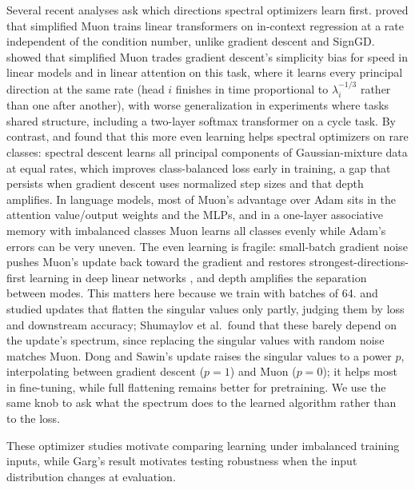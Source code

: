 \documentclass{article}
\begin{document}
Several recent analyses ask which directions spectral optimizers learn first. \citet{ma2026} proved that simplified Muon trains linear transformers on in-context regression at a rate independent of the condition number, unlike gradient descent and SignGD. \citet{dragutinovic2026} showed that simplified Muon trades gradient descent's simplicity bias for speed in linear models and in linear attention on this task, where it learns every principal direction at the same rate (head $i$ finishes in time proportional to $\lambda_i^{-1/3}$ rather than one after another), with worse generalization in experiments where tasks shared structure, including a two-layer softmax transformer on a cycle task. By contrast, \citet{vasudeva2025} and \citet{wang2025muon} found that this more even learning helps spectral optimizers on rare classes: spectral descent learns all principal components of Gaussian-mixture data at equal rates, which improves class-balanced loss early in training, a gap that persists when gradient descent uses normalized step sizes and that depth amplifies. In language models, most of Muon's advantage over Adam sits in the attention value/output weights and the MLPs, and in a one-layer associative memory with imbalanced classes Muon learns all classes evenly while Adam's errors can be very uneven. The even learning is fragile: small-batch gradient noise pushes Muon's update back toward the gradient and restores strongest-directions-first learning in deep linear networks \citep{jacobs2026}, and depth amplifies the separation between modes. This matters here because we train with batches of 64. \citet{dong2026muonp} and \citet{shumaylov2026} studied updates that flatten the singular values only partly, judging them by loss and downstream accuracy; Shumaylov et al.\ found that these barely depend on the update's spectrum, since replacing the singular values with random noise matches Muon. Dong and Sawin's update raises the singular values to a power $p$, interpolating between gradient descent ($p=1$) and Muon ($p=0$); it helps most in fine-tuning, while full flattening remains better for pretraining. We use the same knob to ask what the spectrum does to the learned algorithm rather than to the loss.

These optimizer studies motivate comparing learning under imbalanced training inputs, while Garg's result motivates testing robustness when the input distribution changes at evaluation.
\end{document}
